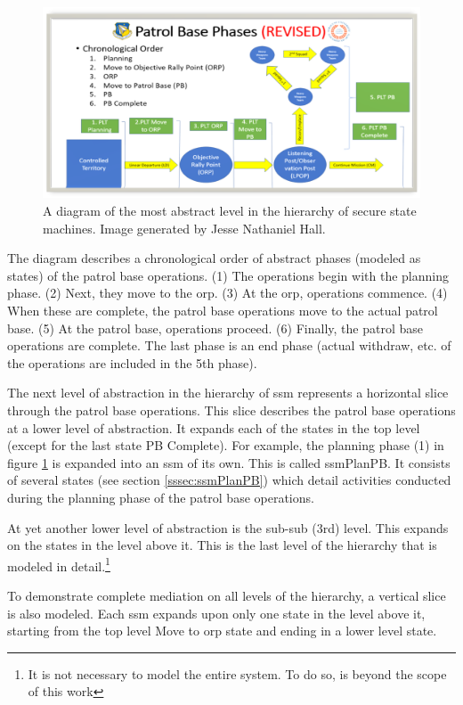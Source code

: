 \documentclass[../../main/main.tex]{subfiles}
\begin{document}
\begin{figure}[h]
\includegraphics[width=\textwidth]{../figures/pbtoplevel}
\caption{\label{pbtoplevel}A diagram of the most abstract level in the hierarchy of secure state machines.  Image generated by Jesse Nathaniel Hall.}
\end{figure}

The diagram describes a chronological order of abstract phases (modeled as states) of the patrol base operations.  (1) The operations begin with the planning phase. (2)  Next, they move to the \gls{orp}. (3) At the \gls{orp}, operations commence. (4)  When these are complete, the patrol base operations move to the actual patrol base.  (5)  At the patrol base, operations proceed.  (6)  Finally, the patrol base operations are complete.  The last phase is an end phase (actual withdraw, etc. of the operations are included in the 5th phase).


The next level of abstraction in the hierarchy of \gls{ssm} represents a horizontal slice through the patrol base operations. This slice describes the patrol base operations at a lower level of abstraction.  It expands each of the states in the top level (except for the last state PB Complete).  For example, the planning phase (1) in figure \ref{pbtoplevel} is expanded into an \gls{ssm} of its own.  This is called ssmPlanPB.  It consists of several states (see section \ref{sssec:ssmPlanPB}) which detail activities conducted during the planning phase of the patrol base operations. 

At yet another lower level of abstraction is the sub-sub (3rd) level.  This expands on the states in the level above it.  This is the last level of the hierarchy that is modeled in detail.\footnote{It is not necessary to model the entire system.  To do so, is beyond the scope of this work}

To demonstrate complete mediation on all levels of the hierarchy, a vertical slice is also modeled.  Each \gls{ssm} expands upon only one state in the level above it, starting from the top level Move to \gls{orp} state and ending in a lower level state. 
\end{document}

